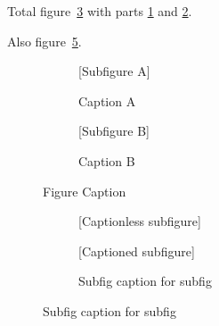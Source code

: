 \documentclass{article}
\begin{document}
Total figure~\ref{fig:1} with parts \ref{fig:1_a} and \ref{fig:1_b}.

Also figure~\ref{fig:2}.

\begin{figure}[t!]%
  \begin{subfigure}[t]{0.5\linewidth}%
    [Subfigure A]
    \caption{{Caption A}}\label{fig:1_a}%
  \end{subfigure}%
  \begin{subfigure}[t]{0.5\linewidth}%
    [Subfigure B]
    \caption{{Caption B}}\label{fig:1_b}%
  \end{subfigure}%
  \caption{Figure Caption}\label{fig:1}%
\end{figure}

\begin{figure}
  \begin{subfigure}{0.5\textwidth}
    [Captionless subfigure]
  \end{subfigure}
\end{figure}
\begin{figure}
  \begin{subfigure}{0.5\textwidth}
    [Captioned subfigure]
    \caption{Subfig caption for subfig}\label{fig:2}
  \end{subfigure}
\end{figure}
\end{document}
